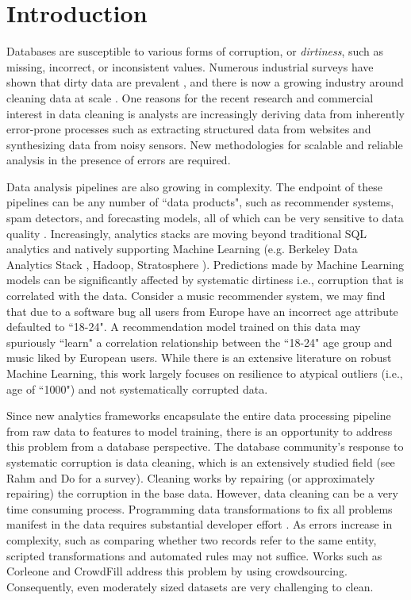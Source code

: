 \section{Introduction}
Databases are susceptible to various forms of corruption, or \emph{dirtiness}, such as missing, incorrect, or inconsistent values.
Numerous industrial surveys have shown that dirty data are prevalent \cite{Gartner}, and there is now a growing industry around cleaning data at scale \cite{fortunearticle}.
One reasons for the recent research and commercial interest in data cleaning is analysts are increasingly deriving data from inherently error-prone processes such as extracting structured data from websites and synthesizing data from noisy sensors.
New methodologies for scalable and reliable analysis in the presence of errors are required. 

Data analysis pipelines are also growing in complexity.
The endpoint of these pipelines can be any number of ``data products", such as recommender systems, spam detectors, and forecasting models, all of which can be very sensitive to data quality \cite{xiaofeature}.
Increasingly, analytics stacks are moving beyond traditional SQL analytics and natively supporting Machine Learning (e.g. Berkeley Data Analytics Stack \cite{bdas}, Hadoop, Stratosphere \cite{alexandrov2014stratosphere}).
Predictions made by Machine Learning models can be significantly affected by systematic dirtiness i.e., corruption that is correlated with the data.
Consider a music recommender system, we may find that due to a software bug all users from Europe have an incorrect age attribute defaulted to ``18-24".
A recommendation model trained on this data may spuriously ``learn" a correlation relationship between the ``18-24" age group and music liked by European users.
While there is an extensive literature on robust Machine Learning, this work largely focuses on resilience to atypical outliers (i.e., age of ``1000") and not systematically corrupted data.

Since new analytics frameworks encapsulate the entire data processing pipeline from raw data to features to model training, there is an opportunity to address this problem from a database perspective.  
The database community's response to systematic corruption is data cleaning, which is an extensively studied field (see Rahm and Do \cite{rahm2000data} for a survey).
Cleaning works by repairing (or approximately repairing) the corruption in the base data.
However, data cleaning can be a very time consuming process.
Programming data transformations to fix all problems manifest in the data requires substantial developer effort \cite{kandel2012}.
As errors increase in complexity, such as comparing whether two records refer to the same entity, scripted transformations and automated rules may not suffice. 
Works such as Corleone\cite{gokhale2014corleone} and CrowdFill\cite{park2014crowdfill} address this problem by using crowdsourcing.
Consequently, even moderately sized datasets are very challenging to clean.


